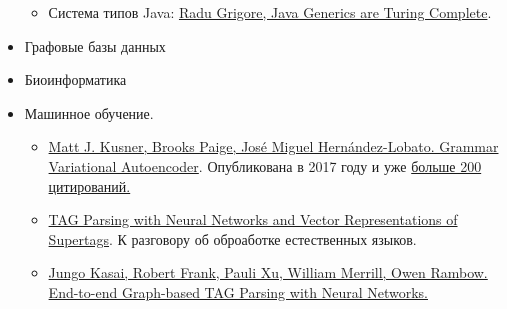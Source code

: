 \begin{itemize}
\begin{itemize}
    \item Система типов Java: \href{https://arxiv.org/abs/1605.05274}{Radu Grigore, Java Generics are Turing Complete}.
  \end{itemize}

  \item Графовые базы данных
  \item Биоинформатика
  \item Машинное обучение.
   \begin{itemize}
      \item \href{https://arxiv.org/abs/1703.01925}{Matt J. Kusner, Brooks Paige, José Miguel Hernández-Lobato. Grammar Variational Autoencoder}. Опубликована в 2017 году и уже \href{https://scholar.google.com/scholar?cites=4080460899049502885&as_sdt=2005&sciodt=0,5&hl=ru}{больше 200 цитирований.}
      \item \href{https://www.aclweb.org/anthology/D17-1180.pdf}{TAG Parsing with Neural Networks and Vector Representations of Supertags}. К разговору об оброаботке естественных языков.
      \item \href{https://arxiv.org/abs/1804.06610}{Jungo Kasai, Robert Frank, Pauli Xu, William Merrill, Owen Rambow. End-to-end Graph-based TAG Parsing with Neural Networks.}
    \end{itemize}


\end{itemize}
